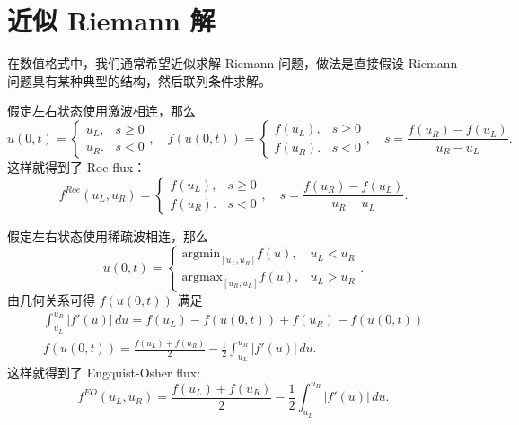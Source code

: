 \section{近似 Riemann 解}

在数值格式中，我们通常希望近似求解 Riemann 问题，做法是直接假设 Riemann 问题具有某种典型的结构，然后联列条件求解。

假定左右状态使用激波相连，那么
\[
    u(0,t) =
    \begin{cases}
        u_L, & s \ge 0 \\
        u_R. & s < 0
    \end{cases},
    \quad
    f(u(0,t)) =
    \begin{cases}
        f(u_L), & s \ge 0 \\
        f(u_R). & s < 0
    \end{cases},
    \quad
    s = \frac{f(u_R)-f(u_L)}{u_R - u_L}.
\]
这样就得到了 Roe flux：
\[
    f^{Roe}(u_L,u_R) =
    \begin{cases}
        f(u_L), & s \ge 0 \\
        f(u_R). & s < 0
    \end{cases},
    \quad
    s = \frac{f(u_R)-f(u_L)}{u_R - u_L}.
\]

假定左右状态使用稀疏波相连，那么
\[
    u(0,t) =
    \begin{cases}
        \text{argmin}_{[u_L,u_R]} f(u), & u_L < u_R \\
        \text{argmax}_{[u_R,u_L]} f(u), & u_L > u_R
    \end{cases}.
\]
由几何关系可得 $f(u(0,t))$ 满足
\begin{gather*}
    \int_{u_L}^{u_R} |f'(u)|\,du = f(u_L) - f(u(0,t)) + f(u_R) - f(u(0,t)) \\
    f(u(0,t)) = \frac{f(u_L) + f(u_R)}2 - \frac12 \int_{u_L}^{u_R} |f'(u)|\,du.
\end{gather*}
这样就得到了 Engquist-Osher flux:
\[
    f^{EO}(u_L,u_R) = \frac{f(u_L) + f(u_R)}2 - \frac12 \int_{u_L}^{u_R} |f'(u)|\,du.
\]

